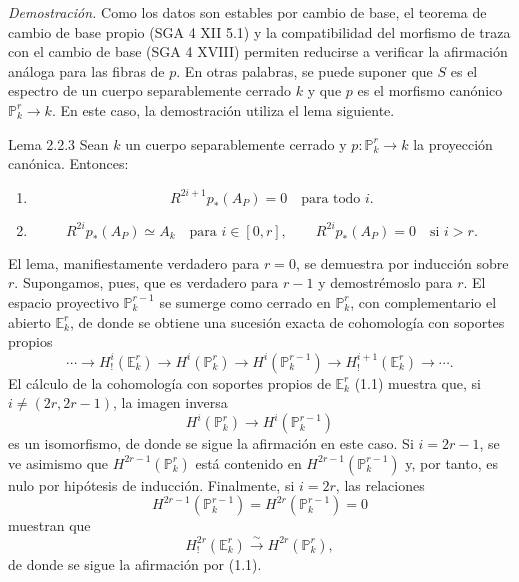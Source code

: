 \emph{Demostración.} Como los datos son estables por cambio de base, el teorema de cambio de base propio (SGA 4 XII 5.1) y la compatibilidad del morfismo de traza con el cambio de base (SGA 4 XVIII) permiten reducirse a verificar la afirmación análoga para las fibras de $p$. En otras palabras, se puede suponer que $S$ es el espectro de un cuerpo separablemente cerrado $k$ y que $p$ es el morfismo canónico $\mathbb P^r_k\to k$. En este caso, la demostración utiliza el lema siguiente.

\begin{statement}{Lema 2.2.3}
Sean $k$ un cuerpo separablemente cerrado y $p:\mathbb P_k^r\to k$ la proyección canónica. Entonces:
\begin{enumerate}[label=\alph*)]
\item
\[
R^{2i+1}p_*(A_P)=0\quad\text{para todo }i.
\]
\item
\[
R^{2i}p_*(A_P)\simeq A_k\quad\text{para }i\in[0,r],
\qquad
R^{2i}p_*(A_P)=0\quad\text{si }i>r.
\]
\end{enumerate}
\end{statement}

El lema, manifiestamente verdadero para $r=0$, se demuestra por inducción sobre $r$. Supongamos, pues, que es verdadero para $r-1$ y demostrémoslo para $r$. El espacio proyectivo $\mathbb P_k^{r-1}$ se sumerge como cerrado en $\mathbb P_k^r$, con complementario el abierto $\mathbb E_k^r$, de donde se obtiene una sucesión exacta de cohomología con soportes propios
\[
\cdots\longrightarrow H_!^i(\mathbb E_k^r)\longrightarrow H^i(\mathbb P_k^r)
\longrightarrow H^i(\mathbb P_k^{r-1})\longrightarrow H_!^{i+1}(\mathbb E_k^r)\longrightarrow\cdots.
\]
El cálculo de la cohomología con soportes propios de $\mathbb E_k^r$ (1.1) muestra que, si $i\ne(2r,2r-1)$, la imagen inversa
\[
H^i(\mathbb P_k^r)\longrightarrow H^i(\mathbb P_k^{r-1})
\]
es un isomorfismo, de donde se sigue la afirmación en este caso. Si $i=2r-1$, se ve asimismo que $H^{2r-1}(\mathbb P_k^r)$ está contenido en $H^{2r-1}(\mathbb P_k^{r-1})$ y, por tanto, es nulo por hipótesis de inducción. Finalmente, si $i=2r$, las relaciones
\[
H^{2r-1}(\mathbb P_k^{r-1})=H^{2r}(\mathbb P_k^{r-1})=0
\]
muestran que
\[
H_!^{2r}(\mathbb E_k^r)\xrightarrow{\sim}H^{2r}(\mathbb P_k^r),
\]
de donde se sigue la afirmación por (1.1).
